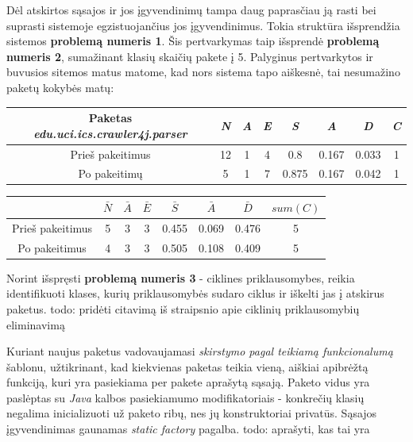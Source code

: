 Dėl atskirtos sąsajos ir jos įgyvendinimų tampa daug paprasčiau ją rasti bei suprasti sistemoje egzistuojančius jos įgyvendinimus.
Tokia struktūra išsprendžia sistemos \textbf{problemą numeris 1}.
Šis pertvarkymas taip išsprendė \textbf{problemą numeris 2}, sumažinant klasių skaičių pakete į 5.
Palyginus pertvarkytos ir buvusios sitemos matus matome, kad nors sistema tapo aiškesnė, tai nesumažino paketų kokybės matų:
\begin{center}
    \begin{tabular}{|c|c|c|c|c|c|c|c|}
        \hline
        Paketas \textit{edu.uci.ics.crawler4j.parser} & \textit{N} & \textit{A} & \textit{E} & \textit{S} & \textit{A} & \textit{D} & \textit{C} \\ [0.5ex]
        \hline\hline
        Prieš pakeitimus & 12 & 1 & 4 & 0.8 & 0.167 & 0.033 & 1 \\
        \hline
        Po pakeitimų & 5 & 1 & 7 & 0.875 & 0.167 & 0.042 & 1 \\
        \hline
    \end{tabular}
    \begin{tabular}{|c|c|c|c|c|c|c|c|}
        \hline
        & $\bar{N}$ & $\bar{A}$ & $\bar{E}$ & $\bar{S}$ & $\bar{A}$ & $\bar{D}$ & $sum(C)$\\ [0.5ex]
        \hline\hline
        Prieš pakeitimus & 5 & 3 & 3 & 0.455 & 0.069 & 0.476 & 5\\
        \hline
        Po pakeitimus & 4 & 3 & 3 & 0.505 & 0.108 & 0.409 & 5 \\
        \hline
    \end{tabular}
\end{center}
Norint išspręsti \textbf{problemą numeris 3} - ciklines priklausomybes, reikia identifikuoti klases, kurių priklausomybės
sudaro ciklus ir iškelti jas į atskirus paketus.
todo: pridėti citavimą iš straipsnio apie ciklinių priklausomybių eliminavimą

Kuriant naujus paketus vadovaujamasi \textit{skirstymo pagal teikiamą funkcionalumą} šablonu, užtikrinant, kad kiekvienas
paketas teikia vieną, aiškiai apibrėžtą funkciją, kuri yra pasiekiama per pakete aprašytą sąsają.
Paketo vidus yra paslėptas su \textit{Java} kalbos pasiekiamumo modifikatoriais - konkrečių klasių negalima inicializuoti už paketo ribų,
nes jų konstruktoriai privatūs.
Sąsajos įgyvendinimas gaunamas \textit{static factory} pagalba.
todo: aprašyti, kas tai yra

